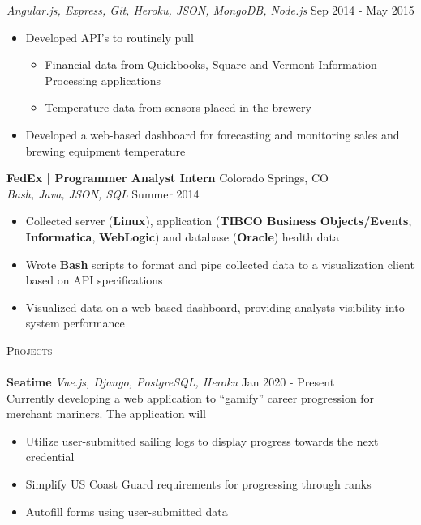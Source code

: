 \documentclass[a4paper]{article}
\newcommand{\lineunder} {
    \vspace*{-8pt} \\
    \hspace*{-18pt} \hrulefill \\
}
\newcommand{\header} [1] {
    {\hspace*{-18pt}\vspace*{6pt} \textsc{#1}}
    \vspace*{-6pt} \lineunder
}
\begin{document}
\textsl{Angular.js, Express, Git, Heroku, JSON, MongoDB, Node.js} \hfill Sep 2014 - May 2015\\
\vspace{-1mm}
\begin{itemize} \itemsep 1pt
	\item  Developed API’s to routinely pull 
	\begin{itemize} \itemsep 1pt
		\item Financial data from Quickbooks, Square and Vermont Information Processing applications 
		\item Temperature data from sensors placed in the brewery
	\end{itemize}
	\item  Developed a web-based dashboard for forecasting and monitoring sales and brewing equipment temperature
\end{itemize}
\textbf{FedEx | Programmer Analyst Intern} \hfill Colorado Springs, CO\\
\textsl{Bash, Java, JSON, SQL} \hfill Summer 2014\\
\vspace{-1mm}
\begin{itemize} \itemsep 1pt
	\item  Collected server (\textbf{Linux}), application (\textbf{TIBCO Business Objects/Events}, \textbf{Informatica}, \textbf{WebLogic}) and database (\textbf{Oracle}) health data
	\item  Wrote \textbf{Bash} scripts to format and pipe collected data to a visualization client based on API specifications
	\item  Visualized data on a web-based dashboard, providing analysts visibility into system performance
\end{itemize}



\header{Projects}
\textbf{Seatime} \hfill
\textsl{Vue.js, Django, PostgreSQL, Heroku} \hfill Jan 2020 - Present\\
\vspace{2mm}
Currently developing a web application to “gamify” career progression for merchant mariners. The application will 
\begin{itemize} \itemsep 1pt
	\item  Utilize user-submitted sailing logs to display progress towards the next credential 
	\item  Simplify US Coast Guard requirements for progressing through ranks 
	\item Autofill forms using user-submitted data
\end{itemize}
\vspace*{2mm}



\ 
\end{document}
